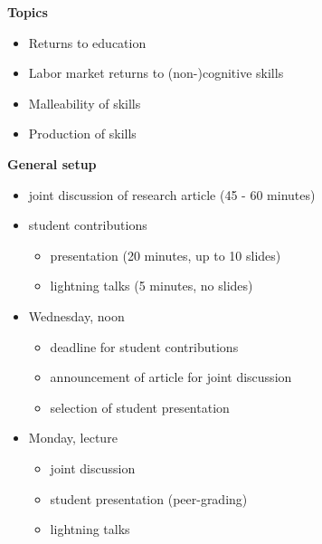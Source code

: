 \begin{frame}\textbf{Topics}\vspace{0.5cm}

\begin{itemize}\setlength\itemsep{1em}
\item Returns to education
\item Labor market returns to (non-)cognitive skills
\item Malleability of skills
\item Production of skills
\end{itemize}

\end{frame}
\begin{frame}\textbf{General setup}\vspace{0.5cm}

\begin{itemize}\setlength\itemsep{1em}
\item joint discussion of research article (45 - 60 minutes)
\item student contributions\medskip
\begin{itemize}\setlength\itemsep{1em}
  \item presentation (20 minutes, up to 10 slides)
  \item lightning talks (5 minutes, no slides)
\end{itemize}
\end{itemize}

\end{frame}
\begin{frame}

\begin{itemize}\setlength\itemsep{1em}
  \item Wednesday, noon\medskip
  \begin{itemize}\setlength\itemsep{1em}
    \item deadline for student contributions
    \item announcement of article for joint discussion
    \item selection of student presentation
  \end{itemize}
  \item Monday, lecture\medskip
  \begin{itemize}\setlength\itemsep{1em}
    \item joint discussion
    \item student presentation (peer-grading)
    \item lightning talks
  \end{itemize}
\end{itemize}
\end{frame}
